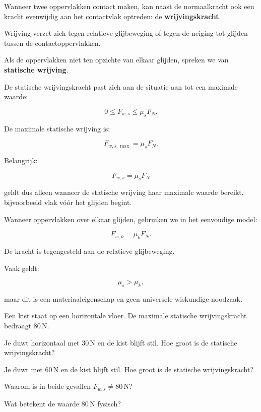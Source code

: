 \documentclass{ximera}
\begin{document}


Wanneer twee oppervlakken contact maken, kan naast de normaalkracht ook
een kracht evenwijdig aan het contactvlak optreden: de
\textbf{wrijvingskracht}.

Wrijving verzet zich tegen relatieve glijbeweging of tegen de neiging
tot glijden tussen de contactoppervlakken.



Als de oppervlakken niet ten opzichte van elkaar glijden, spreken we
van \textbf{statische wrijving}.

De statische wrijvingskracht past zich aan de situatie aan tot een
maximale waarde:

\[
\boxed{
0\leq F_{w,s}\leq \mu_sF_N.
}
\]

De maximale statische wrijving is:

\[
\boxed{
F_{w,s,\max}=\mu_sF_N.
}
\]

Belangrijk:

\[
F_{w,s}=\mu_sF_N
\]

geldt dus alleen wanneer de statische wrijving haar maximale waarde
bereikt, bijvoorbeeld vlak vóór het glijden begint.



Wanneer oppervlakken over elkaar glijden, gebruiken we in het
eenvoudige model:

\[
\boxed{
F_{w,k}=\mu_kF_N.
}
\]

De kracht is tegengesteld aan de relatieve glijbeweging.

Vaak geldt:

\[
\mu_s>\mu_k,
\]

maar dit is een materiaaleigenschap en geen universele wiskundige
noodzaak.


\begin{oefening}{\oefU\ESS}

Een kist staat op een horizontale vloer. De maximale statische
wrijvingskracht bedraagt $80\,\mathrm N$.

\begin{question}
Je duwt horizontaal met $30\,\mathrm N$ en de kist blijft stil.
Hoe groot is de statische wrijvingskracht?
\end{question}

\begin{question}
Je duwt met $60\,\mathrm N$ en de kist blijft stil.
Hoe groot is de statische wrijvingskracht?
\end{question}

\begin{question}
Waarom is in beide gevallen $F_{w,s}\neq80\,\mathrm N$?
\end{question}

\begin{question}
Wat betekent de waarde $80\,\mathrm N$ fysisch?
\end{question}

\end{oefening}
\end{document}
